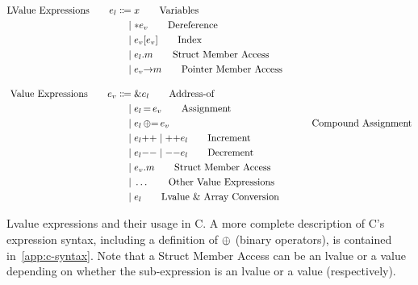 \begin{align*}
  \text{LValue Expressions} \qquad
  e_l \Coloneqq {} & x \tag*{Variables} \\
  \mid {} & \mathord{*} e_v \tag*{Dereference} \\
  \mid {} & e_v[e_v] \tag*{Index} \\
  \mid {} & e_l \mathord{.} m \tag*{Struct Member Access} \\
  \mid {} & e_v \mathord{\rightarrow} m \tag*{Pointer Member Access} \\[1em]
  \text{Value Expressions} \qquad
  e_v \Coloneqq {} & \mathord{\&} e_l \tag*{Address-of} \\
  \mid {} & e_l \mathop{=} e_v \tag*{Assignment} \\
  \mid {} & e_l \mathop{\mathrel{\oplus}=} e_v & \tag*{Compound Assignment} \\
  \mid {} & e_l \mathord{++} \mathrel{\mid} \mathord{++} e_l \tag*{Increment} \\
  \mid {} & e_l \mathord{-{}-} \mathrel{\mid} \mathord{-{}-} e_l \tag*{Decrement} \\
  \mid {} & e_v \mathord{.} m \tag*{Struct Member Access} \\
  \mid {} & \hdots \tag*{Other Value Expressions} \\
  \mid {} & e_l \tag*{Lvalue \& Array Conversion}
\end{align*}%
\caption[Lvalue expressions and their usage in C]{Lvalue expressions
and their usage in C. A more complete description of C's expression
syntax, including a definition of $\oplus$ (binary operators), is
contained in~\autoref{app:c-syntax}. Note that a Struct Member Access
can be an lvalue or a value depending on whether the sub-expression is
an lvalue or a value (respectively).}
\label{fig:lvalue-expressions}

